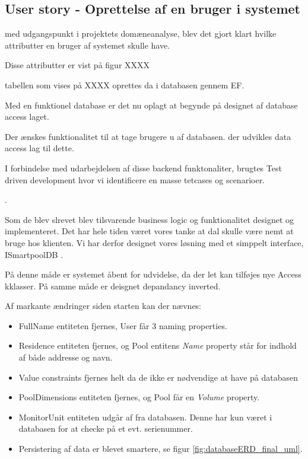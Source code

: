 \subsection{User story - Oprettelse af en bruger i systemet}

med udgangspunkt i projektets domæneanalyse, blev det gjort klart hvilke attributter en bruger af systemet skulle have.

Disse attributter er vist på figur XXXX


tabellen som vises på XXXX oprettes da i databasen gennem EF.

Med en funktionel database er det nu oplagt at begynde på designet af database access laget.

Der ænskes funktionalitet til at tage brugere u af databasen. der udvikles data access lag til dette.

I forbindelse med udarbejdelsen af disse backend funktonaliter, brugtes Test driven development hvor vi identificere en masse tetcases og scenarioer.

.

Som de blev slrevet blev tilsvarende business logic og funktionalitet designet og implementeret.
Det har hele tiden været vores tanke at dal skulle være nemt at bruge hos klienten. Vi har derfor designet vores løsning med et simppelt interface, ISmartpoolDB .

På denne måde er systemet åbent for udvidelse, da der let kan tilføjes nye Access kklasser. På samme måde er deisgnet depandancy inverted.

Af markante ændringer siden starten kan der nævnes:

\begin{itemize}
	\item FullName entiteten fjernes, User får 3 naming properties.
	\item Residence entiteten fjernes, og Pool entitens \textit{Name} property står for indhold af både addresse og navn.
	\item Value constraints fjernes helt da de ikke er nødvendige at have på databasen
	\item PoolDimensions entiteten fjernes, og Pool får en \textit{Volume} property.
	\item MonitorUnit entiteten udgår af fra databasen. Denne har kun været i databasen for at checke på et evt. serienummer.
	\item Persistering af data er blevet smartere, se figur \ref{fig:databaseERD_final_uml}.
\end{itemize}

